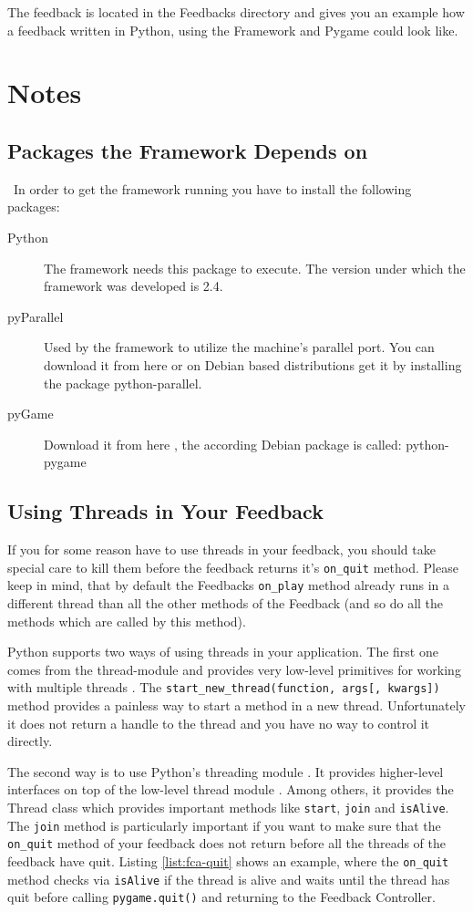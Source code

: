 The feedback is located in the Feedbacks directory and gives you an example how a feedback written in Python, using the Framework and Pygame could look like.

\section{Notes}
\subsection{Packages the Framework Depends on}\
In order to get the framework running you have to install the following packages:
\begin{description}
\item[Python] The framework needs this package to execute. The version under which the framework was developed is 2.4.
\item[pyParallel] \index{pyParallel}Used by the framework to utilize the machine's parallel port. You can download it from here \cite{ref:pyparallel} or on Debian based distributions get it by installing the package python-parallel.
\item[pyGame] Download it from here \cite{ref:pygame}, the according Debian package is called: python-pygame
\end{description}

\subsection{Using Threads in Your Feedback}
If you for some reason have to use threads in your feedback, you should take special care to kill them before the feedback returns it's \verb+on_quit+ method. Please keep in mind, that by default the Feedbacks \lstinline+on_play+ method already runs in a different thread than all the other methods of the Feedback (and so do all the methods which are called by this method).

Python supports two ways of using threads in your application. The first one comes from the thread-module and provides very low-level primitives for working with multiple threads \cite{ref:pydoc-thread}. The \lstinline+start_new_thread(function, args[, kwargs])+ method provides a painless way to start a method in a new thread. Unfortunately it does not return a handle to the thread and you have no way to control it directly.

The second way is to use Python's threading module . It provides higher-level interfaces on top of the low-level thread module \cite{ref:pydoc-threading}. Among others, it provides the Thread class which provides important methods like \lstinline+start+, \lstinline+join+ and \lstinline+isAlive+. The \lstinline+join+ method is particularly important if you want to make sure that the \lstinline+on_quit+ method of your feedback does not return before all the threads of the feedback have quit. Listing \ref{list:fca-quit} shows an example, where the \lstinline+on_quit+ method checks via \lstinline+isAlive+ if the thread is alive and waits until the thread has quit before calling \lstinline+pygame.quit()+ and returning to the Feedback Controller.

